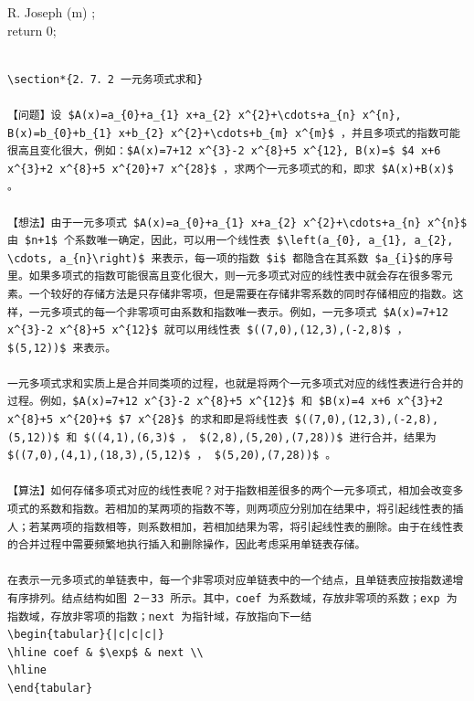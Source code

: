 \documentclass[10pt]{article}
\begin{document}
\begin{verbatim}

\end{verbatim}

R. Joseph (m) ;\\
return 0;

\begin{verbatim}

\section*{2．7．2 一元务项式求和}

【问题】设 $A(x)=a_{0}+a_{1} x+a_{2} x^{2}+\cdots+a_{n} x^{n}, B(x)=b_{0}+b_{1} x+b_{2} x^{2}+\cdots+b_{m} x^{m}$ ，并且多项式的指数可能很高且变化很大，例如：$A(x)=7+12 x^{3}-2 x^{8}+5 x^{12}, B(x)=$ $4 x+6 x^{3}+2 x^{8}+5 x^{20}+7 x^{28}$ ，求两个一元多项式的和，即求 $A(x)+B(x)$ 。

【想法】由于一元多项式 $A(x)=a_{0}+a_{1} x+a_{2} x^{2}+\cdots+a_{n} x^{n}$ 由 $n+1$ 个系数唯一确定，因此，可以用一个线性表 $\left(a_{0}, a_{1}, a_{2}, \cdots, a_{n}\right)$ 来表示，每一项的指数 $i$ 都隐含在其系数 $a_{i}$的序号里。如果多项式的指数可能很高且变化很大，则一元多项式对应的线性表中就会存在很多零元素。一个较好的存储方法是只存储非零项，但是需要在存储非零系数的同时存储相应的指数。这样，一元多项式的每一个非零项可由系数和指数唯一表示。例如，一元多项式 $A(x)=7+12 x^{3}-2 x^{8}+5 x^{12}$ 就可以用线性表 $((7,0),(12,3),(-2,8)$ ， $(5,12))$ 来表示。

一元多项式求和实质上是合并同类项的过程，也就是将两个一元多项式对应的线性表进行合并的过程。例如，$A(x)=7+12 x^{3}-2 x^{8}+5 x^{12}$ 和 $B(x)=4 x+6 x^{3}+2 x^{8}+5 x^{20}+$ $7 x^{28}$ 的求和即是将线性表 $((7,0),(12,3),(-2,8),(5,12))$ 和 $((4,1),(6,3)$ ， $(2,8),(5,20),(7,28))$ 进行合并，结果为 $((7,0),(4,1),(18,3),(5,12)$ ， $(5,20),(7,28))$ 。

【算法】如何存储多项式对应的线性表呢？对于指数相差很多的两个一元多项式，相加会改变多项式的系数和指数。若相加的某两项的指数不等，则两项应分别加在结果中，将引起线性表的插人；若某两项的指数相等，则系数相加，若相加结果为零，将引起线性表的删除。由于在线性表的合并过程中需要频繁地执行插入和删除操作，因此考虑采用单链表存储。

在表示一元多项式的单链表中，每一个非零项对应单链表中的一个结点，且单链表应按指数递增有序排列。结点结构如图 2－33 所示。其中，coef 为系数域，存放非零项的系数；exp 为指数域，存放非零项的指数；next 为指针域，存放指向下一结
\begin{tabular}{|c|c|c|}
\hline coef & $\exp$ & next \\
\hline
\end{tabular}


\end{verbatim}
\end{document}
